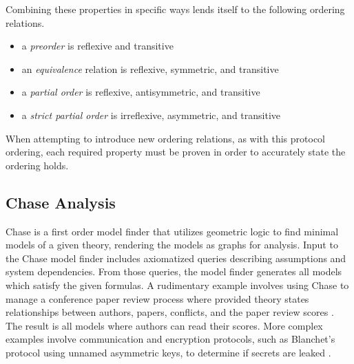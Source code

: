 \documentclass[runningheads]{llncs}
\theoremstyle{definition}
\newcommand{\squash}{\itemsep=0pt\parskip=0pt}
\begin{document}
\noindent Combining these properties in specific ways lends itself to the following ordering relations.

\begin{itemize}
    \squash
    \item a \emph{preorder} is reflexive and transitive
    \item an \emph{equivalence} relation is reflexive, symmetric, and transitive 
    \item a \emph{partial order} is reflexive, antisymmetric, and transitive 
    \item a \emph{strict partial order} is irreflexive, asymmetric, and transitive 
\end{itemize}

\noindent When attempting to introduce new ordering relations, as with this protocol ordering, each required property must be proven in order to accurately state the ordering holds.  

\subsection*{Chase Analysis}

Chase \cite{Ramsdell:2020:Chase,Rowe:2021:AutomatedTrust} is a first order model finder that utilizes geometric logic\cite{Enderton:logic} to find minimal models of a given theory, rendering the models as graphs for analysis. Input to the Chase model finder includes axiomatized queries describing assumptions and system dependencies. From those queries, the model finder generates all models which satisfy the given formulas. A rudimentary example involves using Chase to manage a conference paper review process where provided theory states relationships between authors, papers, conflicts, and the paper review scores \cite{Ramsdell:2020:Chase:Guide}. The result is all models where authors can read their scores. More complex examples involve communication and encryption protocols, such as Blanchet's protocol using unnamed asymmetric keys, to determine if secrets are leaked \cite{Ramsdell:2020:Chase:Guide}. 
\end{document}
